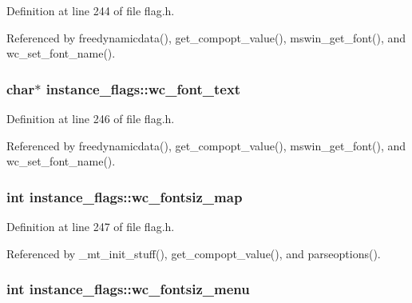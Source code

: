 Definition at line 244 of file flag.\+h.



Referenced by freedynamicdata(), get\+\_\+compopt\+\_\+value(), mswin\+\_\+get\+\_\+font(), and wc\+\_\+set\+\_\+font\+\_\+name().

\hypertarget{structinstance__flags_adadc7a55169eda5a908c200536396872}{
\subsubsection[{wc\+\_\+font\+\_\+text}]{\setlength{\rightskip}{0pt plus 5cm}char$\ast$ instance\+\_\+flags\+::wc\+\_\+font\+\_\+text}}\label{structinstance__flags_adadc7a55169eda5a908c200536396872}


Definition at line 246 of file flag.\+h.



Referenced by freedynamicdata(), get\+\_\+compopt\+\_\+value(), mswin\+\_\+get\+\_\+font(), and wc\+\_\+set\+\_\+font\+\_\+name().

\hypertarget{structinstance__flags_a4d412325a8f75b8c708d5f65c2be84fb}{
\subsubsection[{wc\+\_\+fontsiz\+\_\+map}]{\setlength{\rightskip}{0pt plus 5cm}int instance\+\_\+flags\+::wc\+\_\+fontsiz\+\_\+map}}\label{structinstance__flags_a4d412325a8f75b8c708d5f65c2be84fb}


Definition at line 247 of file flag.\+h.



Referenced by \+\_\+mt\+\_\+init\+\_\+stuff(), get\+\_\+compopt\+\_\+value(), and parseoptions().

\hypertarget{structinstance__flags_adc1e0097a78217c13f627b0ded61338d}{
\subsubsection[{wc\+\_\+fontsiz\+\_\+menu}]{\setlength{\rightskip}{0pt plus 5cm}int instance\+\_\+flags\+::wc\+\_\+fontsiz\+\_\+menu}}\label{structinstance__flags_adc1e0097a78217c13f627b0ded61338d}


